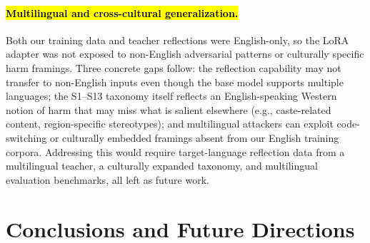 \documentclass[superintelligence,article,accept,moreauthors]{Definitions/mdpi}
\begin{document}
\paragraph{\hl{Multilingual and cross-cultural generalization.}}
Both our training data and teacher reflections were English-only, so the LoRA adapter was not exposed to non-English adversarial patterns or culturally specific harm framings. Three concrete gaps follow: the reflection capability may not transfer to non-English inputs even though the base model supports multiple languages; the S1--S13 taxonomy itself reflects an English-speaking Western notion of harm that may miss what is salient elsewhere (e.g., caste-related content, region-specific stereotypes); and multilingual attackers can exploit code-switching or culturally embedded framings absent from our English training corpora. Addressing this would require target-language reflection data from a multilingual teacher, a culturally expanded taxonomy, and multilingual evaluation benchmarks, all left as future work.

\section{Conclusions and Future Directions}
\end{document}
